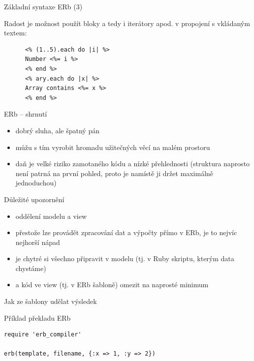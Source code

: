 \documentclass{beamer}
\begin{document}
\begin{frame}[fragile]{Základní syntaxe ERb (3)}
  \begin{block}{ }
    Radost je možnost použít bloky a tedy i iterátory apod. v propojení s vkládaným textem:
    \scriptsize
    \begin{verbatim}
      <% (1..5).each do |i| %>
      Number <%= i %>
      <% end %>
      <% ary.each do |x| %>
      Array contains <%= x %>
      <% end %>
    \end{verbatim}
  \end{block}
\end{frame}

\begin{frame}{ERb -- shrnutí}
  \begin{itemize}
    \item dobrý sluha, ale špatný pán
    \item můžu s tím vyrobit hromadu užitečných věcí na malém prostoru
    \item daň je velké riziko zamotaného kódu a nízké přehlednosti (struktura naprosto není patrná na první pohled, proto je namístě ji držet maximálně jednoduchou)
  \end{itemize}
\end{frame}

\begin{frame}{Důležité upozornění}
  \begin{itemize}
    \item oddělení modelu a view
    \item přestože lze provádět zpracování dat a výpočty přímo v ERb, je to nejvíc nejhorší nápad
    \item je chytré si všechno připravit v modelu (tj. v Ruby skriptu, kterým data chystáme)
    \item a kód ve view (tj. v ERb šabloně) omezit na naprosté minimum
  \end{itemize}
\end{frame}

\begin{frame}[fragile]{Jak ze šablony udělat výsledek}
  \scriptsize
  \begin{block}{Příklad překladu ERb}
    \scriptsize
    \begin{verbatim}
require 'erb_compiler'

erb(template, filename, {:x => 1, :y => 2})
    \end{verbatim}
  \end{block}
\end{frame}
\end{document}
